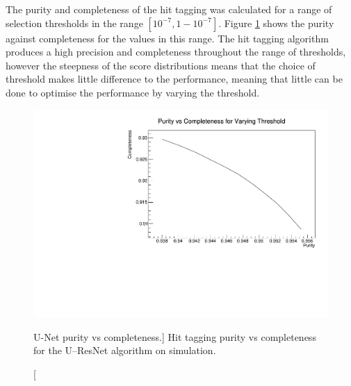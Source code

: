 The purity and completeness of the hit tagging was calculated for a range of 
selection thresholds in the range $[10^{-7}, 1 - 10^{-7}]$. Figure 
\ref{fig:unet_pur_comp} shows the purity against completeness for the values 
in this range. The hit tagging algorithm produces a high precision and 
completeness throughout the range of thresholds, however the steepness of the 
score distributions means that the choice of threshold makes little difference 
to the performance, meaning that little can be done to optimise the performance
by varying the threshold.
\begin{figure}
	\centering
	\includegraphics[width=\textwidth]{figures/unet_pur_v_comp.pdf}
	\caption
	[U-Net purity vs completeness.]
	{Hit tagging purity vs completeness for the U--ResNet algorithm on \protodune{}
	simulation.}
	\label{fig:unet_pur_comp}
\end{figure}


